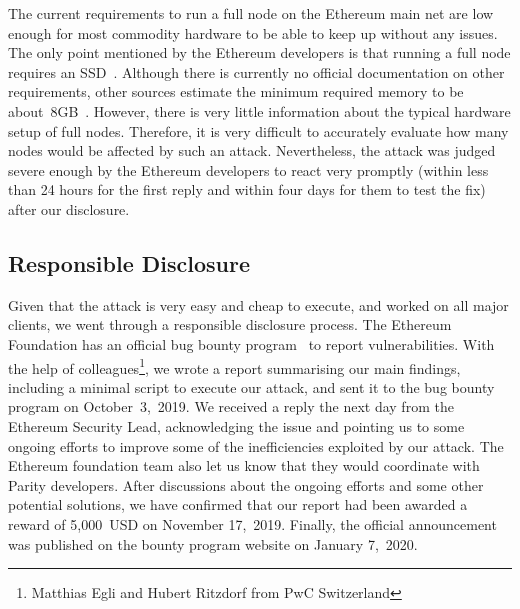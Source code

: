 The current requirements to run a full node on the Ethereum main net are low enough for most commodity hardware to be able to keep up without any issues.
The only point mentioned by the Ethereum developers is that running a full node requires an SSD~\cite{ethereum-faq}.
Although there is currently no official documentation on other requirements, other sources estimate the minimum required memory to be about~8GB~\cite{node-incentive,pantheon-system-requirements,eth-hardware-requirements}.
However, there is very little information about the typical hardware setup of full nodes.
Therefore, it is very difficult to accurately evaluate how many nodes would be affected by such an attack.
Nevertheless, the attack was judged severe enough by the Ethereum developers to react very promptly (within less than 24 hours for the first reply and within four days for them to test the fix) after our disclosure.

\subsection{Responsible Disclosure}
\label{sec:3:responsible}
Given that the attack is very easy and cheap to execute, and worked on all major clients, we went through a responsible disclosure process. The Ethereum Foundation has an official bug bounty program~\cite{ethereum-bug-bounty} to report vulnerabilities. With the help of colleagues\footnote{Matthias Egli and Hubert Ritzdorf from PwC Switzerland}, we wrote a report summarising our main findings, including a minimal script to execute our attack, and sent it to the bug bounty program on October~3,~2019. We received a reply the next day from the Ethereum Security Lead, acknowledging the issue and pointing us to some ongoing efforts to improve some of the inefficiencies exploited by our attack. The Ethereum foundation team also let us know that they would coordinate with Parity developers. After discussions about the ongoing efforts and some other potential solutions, we have confirmed that our report had been awarded a reward of 5,000~USD on November 17,~2019. Finally, the official announcement was published on the bounty program website on January 7,~2020.
